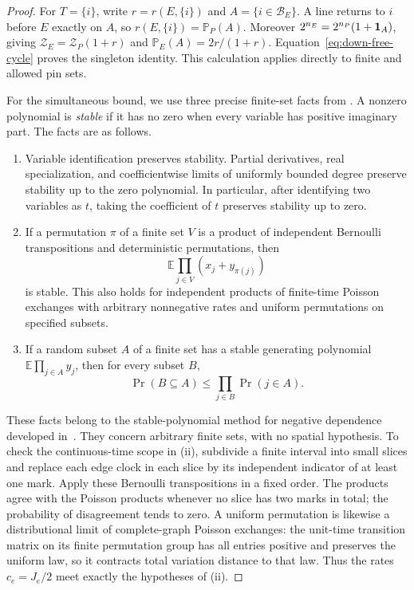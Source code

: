 \begin{proof}
For $T=\{i\}$, write $r=r(E,\{i\})$ and
$A=\{i\in\mathcal B_E\}$. A line returns
to $i$ before $E$ exactly on $A$, so $r(E,\{i\})=\mathbb P_P(A)$.
Moreover $2^{n_E}=2^{n_P}(1+\mathbf1_{A})$, giving
$\mathcal Z_E=\mathcal Z_P(1+r)$ and
$\mathbb P_E(A)=2r/(1+r)$.  Equation~\eqref{eq:down-free-cycle}
proves the singleton identity.
This calculation applies directly to finite and allowed pin sets.

For the simultaneous bound, we use three precise finite-set facts from
\cite[Lemmas~3.2, 3.4, and 3.6]{Ordering}.  A nonzero polynomial is
\emph{stable} if it has no zero when every variable has positive
imaginary part.  The facts are as follows.
\begin{enumerate}[label=(\roman*),leftmargin=*]
\item Variable identification preserves stability.  Partial derivatives,
real specialization, and coefficientwise limits of uniformly bounded
degree preserve stability up to the zero polynomial.  In particular,
after identifying two variables as $t$, taking the coefficient of $t$
preserves stability up to zero.
\item If a permutation $\pi$ of a finite set $V$ is a product of
independent Bernoulli transpositions and deterministic permutations,
then
\[
            \mathbb E\prod_{j\in V}(x_j+y_{\pi(j)})
\]
is stable.  This also holds for independent products of finite-time
Poisson exchanges with arbitrary nonnegative rates and uniform
permutations on specified subsets.
\item If a random subset $A$ of a finite set has a stable generating
polynomial $\mathbb E\prod_{j\in A}y_j$, then for every subset $B$,
\[
                     \Pr(B\subseteq A)\le\prod_{j\in B}\Pr(j\in A).
\]
\end{enumerate}
These facts belong to the stable-polynomial method for negative
dependence developed in~\cite{BBL2009}.  They concern arbitrary finite
sets, with no spatial hypothesis.  To check the continuous-time scope
in (ii), subdivide a
finite interval into small slices and replace each edge clock in each
slice by its independent indicator of at least one mark.  Apply these
Bernoulli transpositions in a fixed order.  The products agree with the
Poisson products whenever no slice has two marks in total; the
probability of disagreement tends to zero.  A uniform permutation is
likewise a distributional limit of complete-graph Poisson exchanges:
the unit-time transition matrix on its finite permutation group has
all entries positive and preserves the uniform law, so it contracts
total variation distance to that law.  Thus the rates $c_e=J_e/2$
meet exactly the hypotheses of (ii).


\end{proof}
